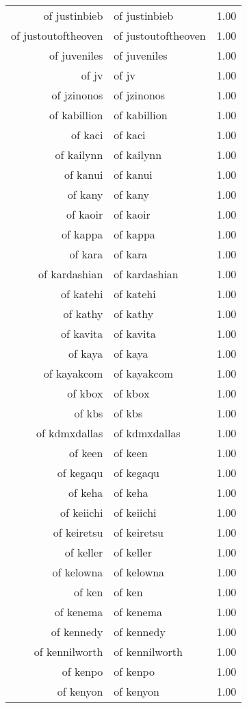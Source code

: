 \begin{table}[ht]
\begin{tabular}{rlr}
  of justinbieb & of justinbieb & 1.00 \\ 
  of justoutoftheoven & of justoutoftheoven & 1.00 \\ 
  of juveniles & of juveniles & 1.00 \\ 
  of jv & of jv & 1.00 \\ 
  of jzinonos & of jzinonos & 1.00 \\ 
  of kabillion & of kabillion & 1.00 \\ 
  of kaci & of kaci & 1.00 \\ 
  of kailynn & of kailynn & 1.00 \\ 
  of kanui & of kanui & 1.00 \\ 
  of kany & of kany & 1.00 \\ 
  of kaoir & of kaoir & 1.00 \\ 
  of kappa & of kappa & 1.00 \\ 
  of kara & of kara & 1.00 \\ 
  of kardashian & of kardashian & 1.00 \\ 
  of katehi & of katehi & 1.00 \\ 
  of kathy & of kathy & 1.00 \\ 
  of kavita & of kavita & 1.00 \\ 
  of kaya & of kaya & 1.00 \\ 
  of kayakcom & of kayakcom & 1.00 \\ 
  of kbox & of kbox & 1.00 \\ 
  of kbs & of kbs & 1.00 \\ 
  of kdmxdallas & of kdmxdallas & 1.00 \\ 
  of keen & of keen & 1.00 \\ 
  of kegaqu & of kegaqu & 1.00 \\ 
  of keha & of keha & 1.00 \\ 
  of keiichi & of keiichi & 1.00 \\ 
  of keiretsu & of keiretsu & 1.00 \\ 
  of keller & of keller & 1.00 \\ 
  of kelowna & of kelowna & 1.00 \\ 
  of ken & of ken & 1.00 \\ 
  of kenema & of kenema & 1.00 \\ 
  of kennedy & of kennedy & 1.00 \\ 
  of kennilworth & of kennilworth & 1.00 \\ 
  of kenpo & of kenpo & 1.00 \\ 
  of kenyon & of kenyon & 1.00 \\ 

\end{tabular}
\end{table}
